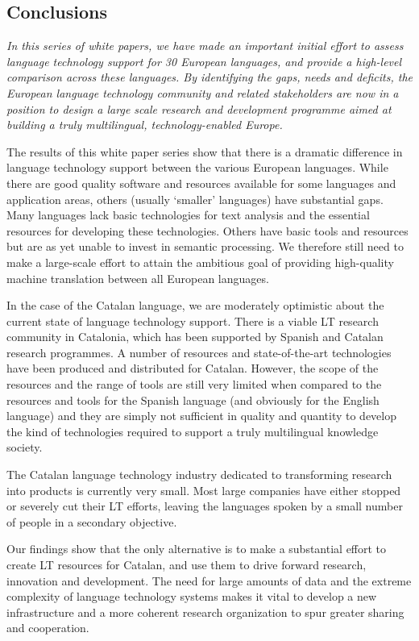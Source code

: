 \begin{multicols}{2}
\subsection{Conclusions}

    \emph{In this series of white papers, we have made an important initial effort to assess language technology support for 30 European languages, and provide a high-level comparison across these languages. By identifying the gaps, needs and deficits, the European language technology community and related stakeholders are now in a position to design a large scale research and development programme aimed at building a truly multilingual, technology-enabled Europe.}

The results of this white paper series show that there is a dramatic difference in language technology support between the various European languages. While there are good quality software and resources available for some languages and application areas, others (usually ‘smaller’ languages) have substantial gaps. Many languages lack basic technologies for text analysis and the essential resources for developing these technologies. Others have basic tools and resources but are as yet unable to invest in semantic processing. We therefore still need to make a large-scale effort to attain the ambitious goal of providing high-quality machine translation between all European languages. 

    In the case of the Catalan language, we are moderately optimistic about the current state of language technology support. There is a viable LT research community in Catalonia, which has been supported by Spanish and Catalan research programmes. A number of resources and state-of-the-art technologies have been produced and distributed for Catalan. However, the scope of the resources and the range of tools are still very limited when compared to the resources and tools for the Spanish language (and obviously for the English language) and they are simply not sufficient in quality and quantity to develop the kind of technologies required to support a truly multilingual knowledge society.

    The Catalan language technology industry dedicated to transforming research into products is currently very small. Most large companies have either stopped or severely cut their LT efforts, leaving the languages spoken by a small number of people in a secondary objective.

    Our findings show that the only alternative is to make a substantial effort to create LT resources for Catalan, and use them to drive forward research, innovation and development. The need for large amounts of data and the extreme complexity of language technology systems makes it vital to develop a new infrastructure and a more coherent research organization to spur greater sharing and cooperation.


\end{multicols}
